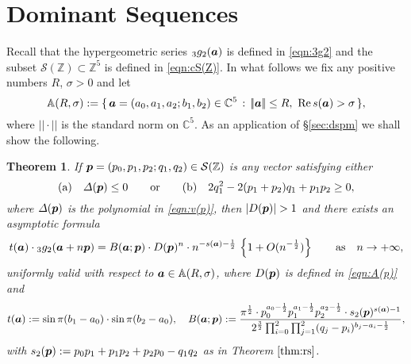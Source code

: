 \documentclass[a4paper,12pt]{article}
\theoremstyle{plain}
\newtheorem{theorem}{Theorem}[section]
\def\rRe{\mathrm{Re}}
\def\A{\mathbb{A}}
\def\C{\mathbb{C}}
\def\Z{\mathbb{Z}}
\def\cS{\mathcal{S}}
\def\vD{\varDelta}
\def\ba{\mbox{\boldmath $a$}}
\def\sba{\mbox{\boldmath ${\scriptstyle a}$}}
\def\bp{\mbox{\boldmath $p$}}
\begin{document}
\section{Dominant Sequences} \label{sec:ds}
Recall that the hypergeometric series ${}_3g_2(\ba)$ is defined in \eqref{eqn:3g2} 
and the subset $\cS(\Z) \subset \Z^5$ is defined in \eqref{eqn:cS(Z)}.  
In what follows we fix any positive numbers $R$, $\sigma > 0$ and let 
\[
\A(R, \sigma) := \{\, \ba = (a_0, a_1, a_2; b_1, b_2) \in \C^5 \,:\, 
|\!| \ba |\!| \le R, \,\, \rRe \, s(\ba) > \sigma \, \},  
\] 
where $|\!| \cdot |\!|$ is the standard norm on $\C^5$. 
As an application of \S \ref{sec:dspm} we shall show the following.      
\begin{theorem} \label{thm:ds} 
If $\bp = (p_0, p_1, p_2; q_1, q_2) \in \cS(\Z)$ is any vector satisfying either 
\begin{equation} \label{eqn:cond-key}
(\mathrm{a}) \quad \vD(\bp) \le 0 \qquad \mbox{or} \qquad 
(\mathrm{b}) \quad  2 q_1^2 - 2 (p_1+p_2) q_1 + p_1 p_2 \ge 0,  
\end{equation}
where $\vD(\bp)$ is the polynomial in \eqref{eqn:v(p)}, 
then $|D(\bp)| > 1$ and there exists an asymptotic formula  
\begin{equation*} 
t(\ba) \cdot {}_3g_2(\ba + n \bp) = B(\ba; \bp)   
\cdot D(\bp)^{n} \cdot n^{-s(\sba) -\frac{1}{2} } 
\, \left\{ 1+ O(n^{-\frac{1}{2} }) \right\} \qquad 
\mbox{as} \quad n \to +\infty,   
\end{equation*} 
uniformly valid with respect to $\ba \in \A(R, \sigma)$, where $D(\bp)$ is 
defined in \eqref{eqn:A(p)} and 
\begin{equation} \label{eqn:B(a;p)}
t(\ba) := \sin \pi(b_1-a_0) \cdot \sin \pi(b_2 - a_0),  \quad 
B(\ba; \bp) := \dfrac{\pi^{ \frac{1}{2} } \cdot  
p_0^{a_0- \frac{1}{2} } p_1^{a_1- \frac{1}{2} } p_2^{a_2- \frac{1}{2} } \cdot  
s_2(\bp)^{s(\sba) - 1}}{2^{ \frac{3}{2} } 
\prod_{i=0}^2 \prod_{j=1}^2 (q_j-p_i)^{b_j-a_i- \frac{1}{2} }},    
\end{equation} 
with $s_2(\bp) := p_0 p_1 + p_1 p_2 + p_2 p_0 - q_1 q_2$ as in 
Theorem $\ref{thm:rs}$.   
\end{theorem} 
\end{document}
